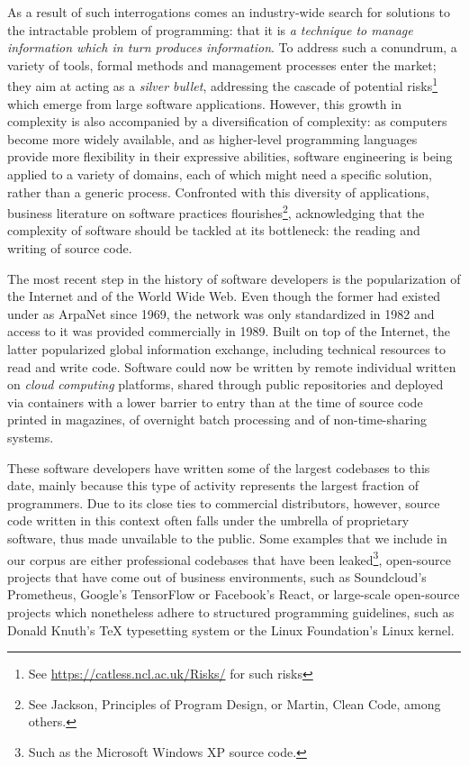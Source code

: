 As a result of such interrogations comes an industry-wide search for solutions to the intractable problem of programming: that it is \emph{a technique to manage information which in turn produces information}. To address such a conundrum, a variety of tools, formal methods and management processes enter the market; they aim at acting as a \emph{silver bullet}\cite{brooks_mythical_1975}, addressing the cascade of potential risks\footnote{See \url{https://catless.ncl.ac.uk/Risks/} for such risks} which emerge from large software applications. However, this growth in complexity is also accompanied by a diversification of complexity: as computers become more widely available, and as higher-level programming languages provide more flexibility in their expressive abilities, software engineering is being applied to a variety of domains, each of which might need a specific solution, rather than a generic process. Confronted with this diversity of applications, business literature on software practices flourishes\footnote{See Jackson, Principles of Program Design, or Martin, Clean Code, among others.}, acknowledging that the complexity of software should be tackled at its bottleneck: the reading and writing of source code.

The most recent step in the history of software developers is the popularization of the Internet and of the World Wide Web. Even though the former had existed under as ArpaNet since 1969, the network was only standardized in 1982 and access to it was provided commercially in 1989. Built on top of the Internet, the latter popularized global information exchange, including technical resources to read and write code. Software could now be written by remote individual written on \emph{cloud computing}  platforms, shared through public repositories and deployed via containers with a lower barrier to entry than at the time of source code printed in magazines, of overnight batch processing and of non-time-sharing systems.

\vspace*{1\baselineskip}

These software developers have written some of the largest codebases to this date, mainly because this type of activity represents the largest fraction of programmers. Due to its close ties to commercial distributors, however, source code written in this context often falls under the umbrella of proprietary software, thus made unvailable to the public. Some examples that we include in our corpus are either professional codebases that have been leaked\footnote{Such as the Microsoft Windows XP source code\cite{warren_windows_2020}.}, open-source projects that have come out of business environments, such as Soundcloud's Prometheus, Google's TensorFlow or Facebook's React, or large-scale open-source projects which nonetheless adhere to structured programming guidelines, such as Donald Knuth's TeX typesetting system or the Linux Foundation's Linux kernel.

